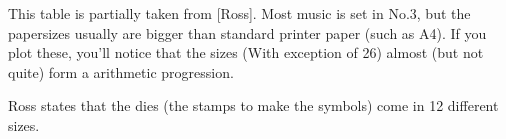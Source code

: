 \documentclass{article}
\begin{document}
This table is partially taken from [Ross].  Most music is set in No.3,
but the papersizes usually are bigger than standard printer paper
(such as A4).  If you plot these, you'll notice that the sizes (With
exception of 26) almost (but not quite) form a arithmetic progression.

Ross states that the dies (the stamps to make the symbols) come in
12 different sizes.



\end{document}
